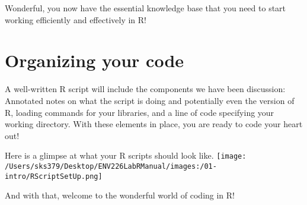 \documentclass[
]{book}
\begin{document}
Wonderful, you now have the essential knowledge base that you need to start working efficiently and effectively in R!

\hypertarget{organizing-your-code}{%
\section{Organizing your code}\label{organizing-your-code}}

A well-written R script will include the components we have been discussion: Annotated notes on what the script is doing and potentially even the version of R, loading commands for your libraries, and a line of code specifying your working directory. With these elements in place, you are ready to code your heart out!

Here is a glimpse at what your R scripts should look like.
\texttt{[image: /Users/sks379/Desktop/ENV226LabRManual/images:/01-intro/RScriptSetUp.png]}

And with that, welcome to the wonderful world of coding in R!

  
\end{document}
